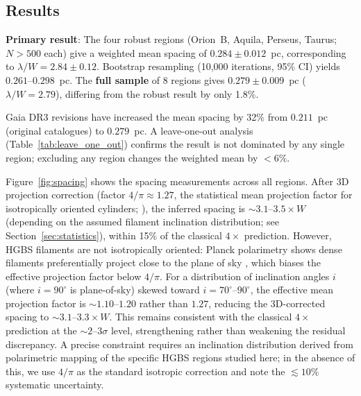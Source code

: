 \documentclass[twoside,twocolumn]{mnras}
\begin{document}
\subsection{Results}
\label{sec:results}

\textbf{Primary result}: The four robust regions (Orion~B, Aquila, Perseus, Taurus;
$N > 500$ each) give a weighted mean spacing of $0.284 \pm 0.012$~pc,
corresponding to $\lambda/W = 2.84 \pm 0.12$. Bootstrap resampling (10,000 iterations,
95\% CI) yields $0.261$--$0.298$~pc. The \textbf{full sample} of 8 regions gives
$0.279 \pm 0.009$~pc ($\lambda/W = 2.79$), differing from the robust result by
only 1.8\%.

Gaia DR3 revisions have increased the mean spacing by 32\% from $0.211$~pc (original
catalogues) to $0.279$~pc. A leave-one-out analysis (Table~\ref{tab:leave_one_out})
confirms the result is not dominated by any single region; excluding any region changes
the weighted mean by $<6\%$.

Figure~\ref{fig:spacing} shows the spacing measurements across all regions.
After 3D projection correction (factor $4/\pi \approx 1.27$, the statistical mean projection factor for isotropically oriented cylinders; \citealt{Andre2010}), the inferred spacing is ${\sim}3.1$--$3.5\times W$ (depending on the assumed filament inclination distribution; see Section~\ref{sec:statistics}), within 15\% of the classical $4\times$ prediction. However, HGBS filaments are not isotropically oriented: Planck polarimetry shows dense filaments preferentially project close to the plane of sky \citep{Planck2016}, which biases the effective projection factor below $4/\pi$. For a distribution of inclination angles $i$ (where $i=90^\circ$ is plane-of-sky) skewed toward $i=70^\circ$--$90^\circ$, the effective mean projection factor is ${\sim}1.10$--$1.20$ rather than $1.27$, reducing the 3D-corrected spacing to ${\sim}3.1$--$3.3\times W$. This remains consistent with the classical $4\times$ prediction at the $\sim 2$--$3\sigma$ level, strengthening rather than weakening the residual discrepancy. A precise constraint requires an inclination distribution derived from polarimetric mapping of the specific HGBS regions studied here; in the absence of this, we use $4/\pi$ as the standard isotropic correction and note the $\lesssim 10\%$ systematic uncertainty.
\end{document}
